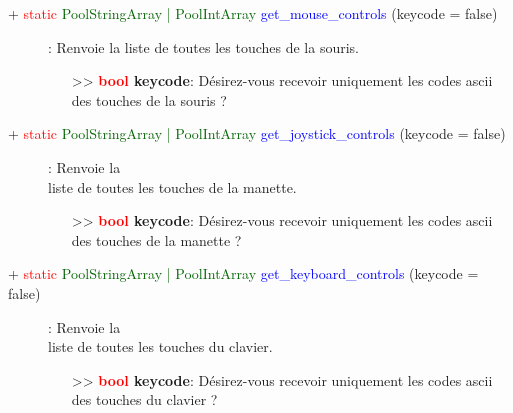 \documentclass[a4paper, 11pt]{article}
\begin{document}
	\begin{description}
		\item [+ \textcolor{red}{static} \textcolor{darkgreen}{PoolStringArray | PoolIntArray} 
		\textcolor{blue}{get\_mouse\_controls} (keycode = false)]: Renvoie la liste de toutes les touches
		de la souris.
		\begin{itemize}
			\item[>> \textbf{\textcolor{red}{bool} keycode}:] Désirez-vous recevoir uniquement les codes
			ascii des touches de la souris ?\\
		\end{itemize}
	\end{description}
	\begin{description}
		\item [+ \textcolor{red}{static} \textcolor{darkgreen}{PoolStringArray | PoolIntArray} 
		\textcolor{blue}{get\_joystick\_controls} (keycode = false)]: Renvoie la \\liste de toutes les 
		touches de la manette.
		\begin{itemize}
			\item[>> \textbf{\textcolor{red}{bool} keycode}:] Désirez-vous recevoir uniquement les codes
			ascii des touches de la manette ?\\
		\end{itemize}
	\end{description}
	\begin{description}
		\item [+ \textcolor{red}{static} \textcolor{darkgreen}{PoolStringArray | PoolIntArray} 
		\textcolor{blue}{get\_keyboard\_controls} (keycode = false)]: Renvoie la \\liste de toutes les 
		touches du clavier.
		\begin{itemize}
			\item[>> \textbf{\textcolor{red}{bool} keycode}:] Désirez-vous recevoir uniquement les codes
			ascii des touches du clavier ?\\
		\end{itemize}
	\end{description}
\end{document}
